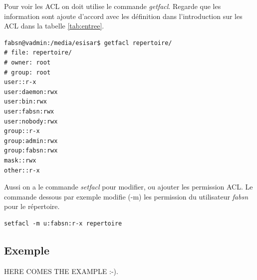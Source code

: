 Pour voir les ACL on doit utilise le commande \emph{getfacl}. Regarde que les information sont ajoute d'accord avec les définition dans l'introduction sur les ACL dans la tabelle \ref{tab:entree}. 

\begin{verbatim}
fabsn@vadmin:/media/esisar$ getfacl repertoire/
# file: repertoire/
# owner: root
# group: root
user::r-x
user:daemon:rwx
user:bin:rwx
user:fabsn:rwx
user:nobody:rwx
group::r-x
group:admin:rwx
group:fabsn:rwx
mask::rwx
other::r-x	
\end{verbatim}

Aussi on a le commande \emph{setfacl} pour modifier, ou ajouter les permission ACL. Le commande dessous par exemple modifie (-m) les permission du utilisateur \emph{fabsn} pour le répertoire. 

\begin{verbatim}
setfacl -m u:fabsn:r-x repertoire
\end{verbatim}

\subsection*{Exemple}

HERE COMES THE EXAMPLE :-).

